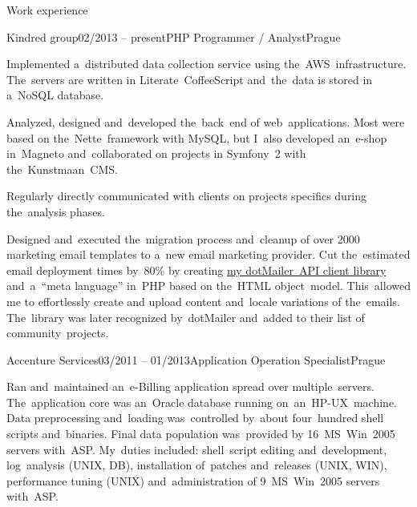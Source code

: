 \documentclass{resume}
\begin{document}
    \begin{rSection}{Work experience}

        \begin{rSubsection}{Kindred group}{02/2013 -- present}{PHP Programmer / Analyst}{Prague}
            \item Implemented a~distributed data collection service using the~AWS~infrastructure.
            The~servers are written in Literate~CoffeeScript and~the~data is stored in a~NoSQL database.

            \item Analyzed, designed and~developed the~back~end of web~applications.
            Most were based on the~Nette~framework with MySQL,
            but I~also developed an~e-shop in~Magneto and~collaborated on projects in Symfony~2 with the~Kunstmaan~CMS.

            \item Regularly directly communicated with clients on projects specifics during the~analysis phases.

            \item Designed and~executed the~migration process and~cleanup of over 2000 marketing email templates
            to a~new email marketing provider.
            Cut the~estimated email deployment times by~80\% by
            creating \href{https://github.com/romanpitak/dotMailer-API-v2-PHP-client}{my dotMailer~API client library}
            and~a~“meta language” in~PHP based on the~HTML object~model.
            This~allowed me to effortlessly create and upload content and~locale variations of the~emails.
            The~library was later recognized by~dotMailer and~added to their list of community~projects.
        \end{rSubsection}

        \begin{rSubsection}{Accenture Services}{03/2011 -- 01/2013}{Application Operation Specialist}{Prague}
            \item Ran and~maintained an~e-Billing application spread over multiple~servers.
            The~application core was \mbox{an Oracle} database running on~an~HP-UX~machine.
            Data preprocessing and~loading was~controlled by~about four~hundred shell scripts and~binaries.
            Final data population was~provided by 16~MS~Win~2005 servers with~ASP.
            My~duties included: shell~script editing and~development, log~analysis (UNIX, DB),
            installation of~patches and~releases (UNIX, WIN), performance tuning (UNIX)
            and~administration of 9~MS~Win~2005 servers with~ASP.


\end{rSubsection}
\end{rSection}
\end{document}
